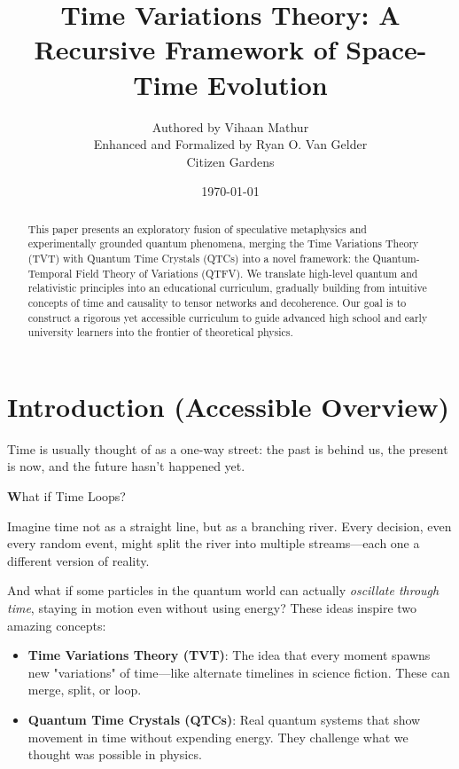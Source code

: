 \documentclass{article}
\theoremstyle{plain}
\theoremstyle{claimstyle}
\begin{document}
\title{\textbf{Time Variations Theory: A Recursive Framework of Space-Time Evolution}}
\author{Authored by Vihaan Mathur\\ Enhanced and Formalized by Ryan O. Van Gelder\\Citizen Gardens}
\date{\today}


\maketitle

\begin{abstract}
This paper presents an exploratory fusion of speculative metaphysics and experimentally grounded quantum phenomena, merging the Time Variations Theory (TVT) with Quantum Time Crystals (QTCs) into a novel framework: the Quantum-Temporal Field Theory of Variations (QTFV). We translate high-level quantum and relativistic principles into an educational curriculum, gradually building from intuitive concepts of time and causality to tensor networks and decoherence. Our goal is to construct a rigorous yet accessible curriculum to guide advanced high school and early university learners into the frontier of theoretical physics.
\end{abstract}

\section{Introduction (Accessible Overview)}

Time is usually thought of as a one-way street: the past is behind us, the present is now, and the future hasn't happened yet. 

\textbf What if Time Loops?

Imagine time not as a straight line, but as a branching river. Every decision, even every random event, might split the river into multiple streams---each one a different version of reality.

And what if some particles in the quantum world can actually \textit{oscillate through time}, staying in motion even without using energy? These ideas inspire two amazing concepts:

\begin{itemize}
  \item \textbf{Time Variations Theory (TVT)}: The idea that every moment spawns new "variations" of time---like alternate timelines in science fiction. These can merge, split, or loop.
  \item \textbf{Quantum Time Crystals (QTCs)}: Real quantum systems that show movement in time without expending energy. They challenge what we thought was possible in physics.
\end{itemize}
\end{document}
